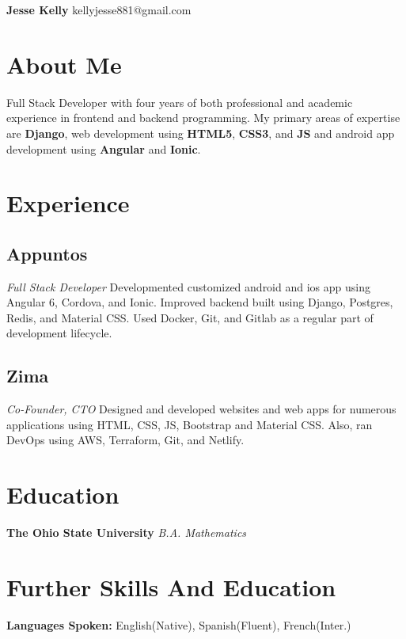 \documentclass[letterpaper,11pt]{article}
\begin{document}
\begin{flushleft}
\Large{\textbf{Jesse Kelly}}
\newline
kellyjesse881@gmail.com
\end{flushleft}

\section{About Me}
Full Stack Developer with four years of both
professional and academic experience in frontend
and backend programming. My primary areas of
expertise are \textbf{Django}, web development using \textbf{HTML5},
\textbf{CSS3}, and \textbf{JS} and android app development using
\textbf{Angular} and \textbf{Ionic}.

\section{Experience}
\subsection{Appuntos}
\textit{Full Stack Developer}
\vspace{2mm}
\newline
Developmented customized android and ios
app using Angular 6, Cordova, and Ionic.
Improved backend built using Django,
Postgres, Redis, and Material CSS. Used
Docker, Git, and Gitlab as a regular part
of development lifecycle.

\subsection{Zima}
\textit{Co-Founder, CTO}
\vspace{2mm}
\newline
Designed and developed websites and web
apps for numerous applications using
HTML, CSS, JS, Bootstrap and Material CSS.
Also, ran DevOps using AWS, Terraform,
Git, and Netlify.

\section{Education}
\textbf{The Ohio State University}
\newline
\textit{B.A. Mathematics}

\section{Further Skills And Education}
\textbf{Languages Spoken: } English(Native), Spanish(Fluent), French(Inter.)
\end{document}

